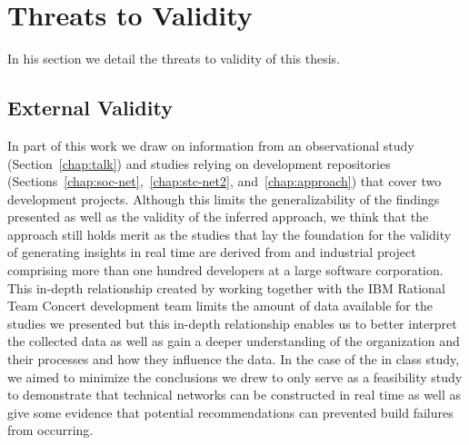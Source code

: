 


\section{Threats to Validity}
\label{sec:threat}
In his section we detail the threats to validity of this thesis.

\subsection{External Validity}
In part of this work we draw on information from an observational study (Section~\ref{chap:talk}) and studies relying on development repositories (Sections~\ref{chap:soc-net},~\ref{chap:stc-net2}, and~\ref{chap:approach}) that cover two development projects.
Although this limits the generalizability of the findings presented as well as the validity of the inferred approach, we think that the approach still holds merit as the studies that lay the foundation for the validity of generating insights in real time are derived from and industrial project comprising more than one hundred developers at a large software corporation.
This in-depth relationship created by working together with the IBM Rational Team Concert development team limits the amount of data available for the studies we presented but this in-depth relationship enables us to better interpret the collected data as well as gain a deeper understanding of the organization and their processes and how they influence the data.
In the case of the in class study, we aimed to minimize the conclusions we drew to only serve as a feasibility study to demonstrate that technical networks can be constructed in real time as well as give some evidence that potential recommendations can prevented build failures from occurring.

